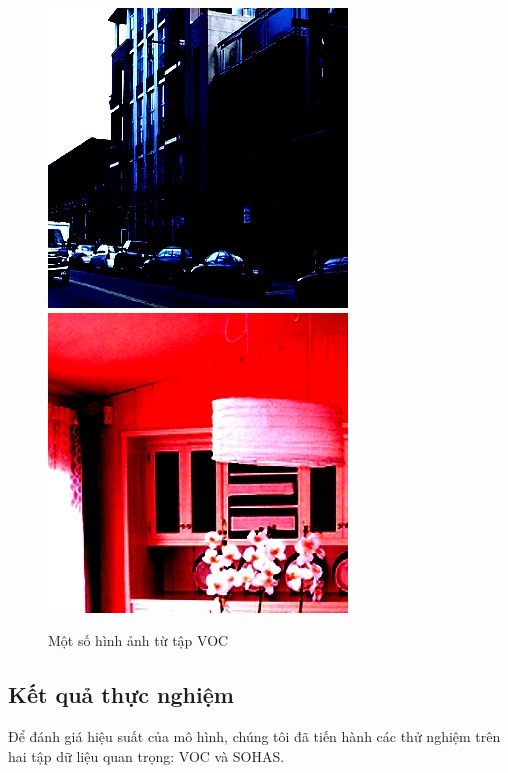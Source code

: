 \documentclass[a4paper]{article}
\begin{document}
\begin{figure}[h]
\begin{multicols}{4}
		\includegraphics[width=0.8\linewidth]{fig/normalize/_3}
		\includegraphics[width=0.8\linewidth]{fig/normalize/_4}
	\end{multicols}
	\caption{Một số hình ảnh từ tập VOC}
	\label{exampleonVOC}
\end{figure}

\subsection{\textbf{Kết quả thực nghiệm}}

Để đánh giá hiệu suất của mô hình, chúng tôi đã tiến hành các thử nghiệm trên hai tập dữ liệu quan trọng: VOC và SOHAS.
\end{document}
